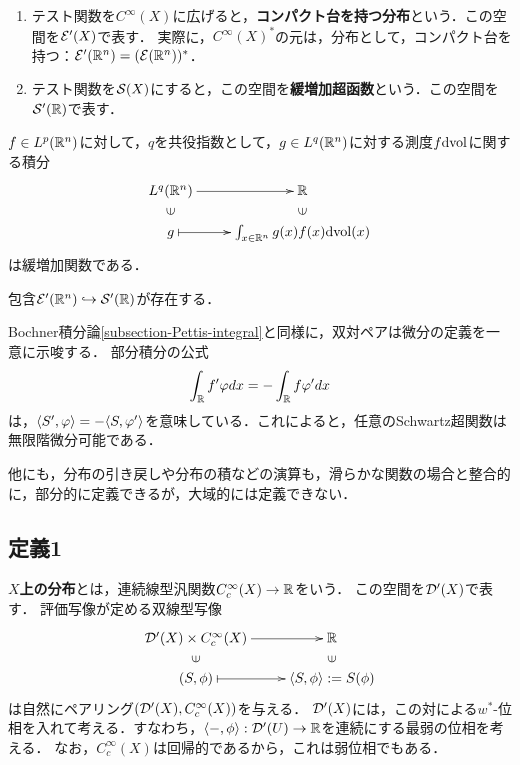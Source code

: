 \documentclass[uplatex,dvipdfmx]{jsreport}
\begin{document}
\begin{definition}\mbox{}
    \begin{enumerate}
        \item テスト関数を$C^\infty(X)$に広げると，\textbf{コンパクト台を持つ分布}という．この空間を$\mathcal{E}'(X)$で表す．
        実際に，$C^\infty(X)^*$の元は，分布として，コンパクト台を持つ：$\mathcal{E}'(\mathbb{R}^n)=(\mathcal{E}(\mathbb{R}^n))^*$．
        \item テスト関数を$\mathcal{S}(X)$にすると，この空間を\textbf{緩増加超函数}という．この空間を$\mathcal{S}'(\mathbb{R})$で表す．
    \end{enumerate}
\end{definition}

\begin{example}
    $f\in L^p(\mathbb{R}^n)$に対して，$q$を共役指数として，$g\in L^q(\mathbb{R}^n)$に対する測度$f\mathrm{dvol}$に関する積分
    \[\xymatrix@R-2pc{
        L^q(\R^n)\ar[r]&\R\\
        \rotatebox[origin=c]{90}{$\in$}&\rotatebox[origin=c]{90}{$\in$}\\
        g\ar@{|->}[r]&\int_{x\in\R^n}g(x)f(x)\dvol(x)
    }\]
    は緩増加関数である．
\end{example}

\begin{theorem}
    包含$\mathcal{E}'(\mathbb{R}^n)\hookrightarrow\mathcal{S}'(\mathbb{R})$が存在する．
\end{theorem}

\begin{discussion}[双対ペアと微分]
    Bochner積分論\ref{subsection-Pettis-integral}と同様に，双対ペアは微分の定義を一意に示唆する．
    部分積分の公式
    \[\int_{\mathbb{R}} f'\varphi dx=-\int_{\mathbb{R}} f\varphi'dx\]
    は，$\langle S',\varphi\rangle=-\langle S,\varphi'\rangle$を意味している．これによると，任意のSchwartz超関数は無限階微分可能である．
\end{discussion}

\begin{discussion}[その他の操作と演算]
    他にも，分布の引き戻しや分布の積などの演算も，滑らかな関数の場合と整合的に，部分的に定義できるが，大域的には定義できない．
\end{discussion}

\subsection{定義1}

\begin{definition}[distribution on $X$]
    \textbf{$X$上の分布}とは，連続線型汎関数$C_c^\infty(X)\to\mathbb{R}$をいう．
    この空間を$\mathcal{D}'(X)$で表す．
    評価写像が定める双線型写像
    \[\xymatrix@R-2pc{
        \D'(X)\times C^\infty_c(X)\ar[r]&\R\\
        \rotatebox[origin=c]{90}{$\in$}&\rotatebox[origin=c]{90}{$\in$}\\
        (S,\phi)\ar@{|->}[r]&\brac{S,\phi}:=S(\phi)
    }\]
    は自然にペアリング$(\mathcal{D}'(X),C_c^\infty(X))$を与える．
    $\mathcal{D}'(X)$には，この対による$w^*$-位相を入れて考える．すなわち，$\langle-,\phi\rangle:\mathcal{D}'(U)\to\mathbb{R}$を連続にする最弱の位相を考える．
    なお，$C^\infty_c(X)$は回帰的であるから，これは弱位相でもある．
\end{definition}
\end{document}
